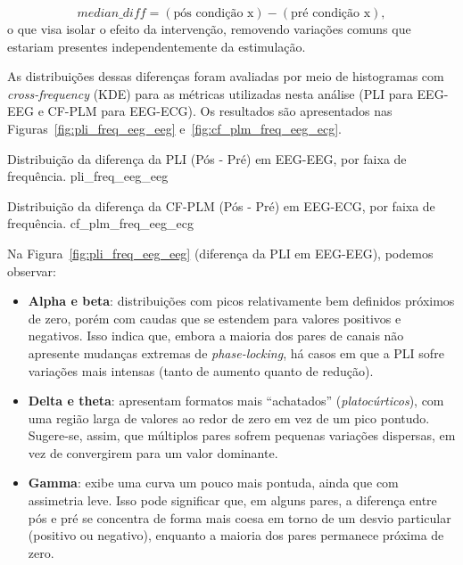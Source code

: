 \[
\textit{median\_diff} = (\text{pós condição x}) - (\text{pré condição x}),
\]
o que visa isolar o efeito da intervenção, removendo variações comuns que estariam presentes independentemente da estimulação.

As distribuições dessas diferenças foram avaliadas por meio de histogramas com \textit{cross-frequency} (KDE) para as métricas utilizadas nesta análise (PLI para EEG-EEG e CF-PLM para EEG-ECG). Os resultados são apresentados nas Figuras~\ref{fig:pli_freq_eeg_eeg} e~\ref{fig:cf_plm_freq_eeg_ecg}.

{}
{Distribuição da diferença da PLI (Pós - Pré) em EEG-EEG, por faixa de frequência.}
{pli_freq_eeg_eeg}

{Distribuição da diferença da CF-PLM (Pós - Pré) em EEG-ECG, por faixa de frequência.}
{cf_plm_freq_eeg_ecg}

Na Figura~\ref{fig:pli_freq_eeg_eeg} (diferença da PLI em EEG-EEG), podemos observar:
\begin{itemize}
    \item \textbf{Alpha e beta}: distribuições com picos relativamente bem definidos próximos de zero, porém com caudas que se estendem para valores positivos e negativos. Isso indica que, embora a maioria dos pares de canais não apresente mudanças extremas de \emph{phase-locking}, há casos em que a PLI sofre variações mais intensas (tanto de aumento quanto de redução).
    \item \textbf{Delta e theta}: apresentam formatos mais ``achatados'' (\emph{platocúrticos}), com uma região larga de valores ao redor de zero em vez de um pico pontudo. Sugere-se, assim, que múltiplos pares sofrem pequenas variações dispersas, em vez de convergirem para um valor dominante.
    \item \textbf{Gamma}: exibe uma curva um pouco mais pontuda, ainda que com assimetria leve. Isso pode significar que, em alguns pares, a diferença entre pós e pré se concentra de forma mais coesa em torno de um desvio particular (positivo ou negativo), enquanto a maioria dos pares permanece próxima de zero.
\end{itemize}

